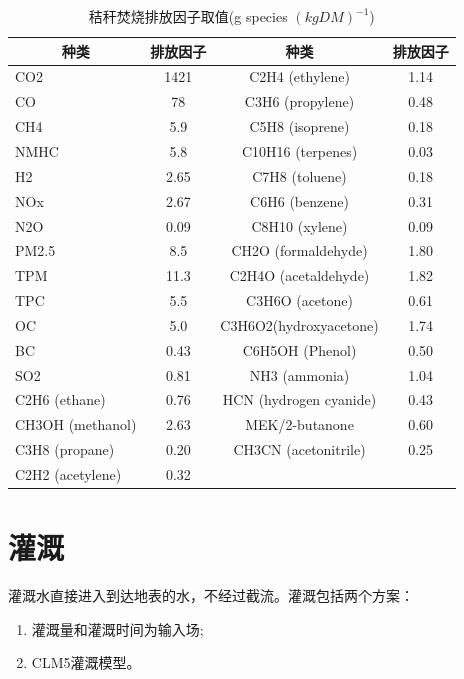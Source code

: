 \begin{table}[]
  \centering
  \caption{秸秆焚烧排放因子取值(g species $(kg DM)^{-1}$)}
  \label{tab:秸秆焚烧排放因子取值}
  \begin{tabular}{@{}lccc@{}}
  \toprule
  \multicolumn{1}{c}{种类} & 排放因子 & 种类                     & 排放因子 \\ \midrule
  CO2                    & 1421 & C2H4   (ethylene)      & 1.14 \\
  CO                     & 78   & C3H6   (propylene)     & 0.48 \\
  CH4                    & 5.9  & C5H8   (isoprene)      & 0.18 \\
  NMHC                   & 5.8  & C10H16   (terpenes)    & 0.03 \\
  H2                     & 2.65 & C7H8   (toluene)       & 0.18 \\
  NOx                    & 2.67 & C6H6   (benzene)       & 0.31 \\
  N2O                    & 0.09 & C8H10   (xylene)       & 0.09 \\
  PM2.5                  & 8.5  & CH2O   (formaldehyde)  & 1.80 \\
  TPM                    & 11.3 & C2H4O   (acetaldehyde) & 1.82 \\
  TPC                    & 5.5  & C3H6O   (acetone)      & 0.61 \\
  OC                     & 5.0  & C3H6O2(hydroxyacetone) & 1.74 \\
  BC                     & 0.43 & C6H5OH   (Phenol)      & 0.50 \\
  SO2                    & 0.81 & NH3 (ammonia)          & 1.04 \\
  C2H6   (ethane)        & 0.76 & HCN (hydrogen cyanide) & 0.43 \\
  CH3OH   (methanol)     & 2.63 & MEK/2-butanone         & 0.60 \\
  C3H8   (propane)       & 0.20 & CH3CN   (acetonitrile) & 0.25 \\
  C2H2   (acetylene)     & 0.32 &                        &      \\ \bottomrule
  \end{tabular}
  \end{table}

\section{灌溉}
灌溉水直接进入到达地表的水，不经过截流。灌溉包括两个方案：
\begin{enumerate}
  \item 灌溉量和灌溉时间为输入场;
  \item CLM5灌溉模型。
\end{enumerate}
